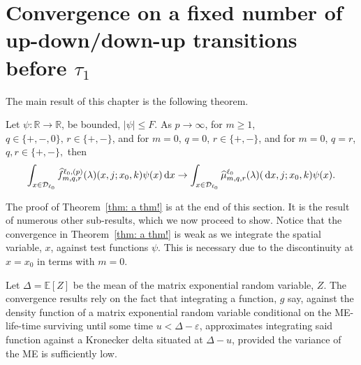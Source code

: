 \section{Convergence on a fixed number of up-down/down-up transitions before \(\tau_1\)}\label{sec: no change convergence}
The main result of this chapter is the following theorem.
\begin{thm}\label{thm: a thm!}
	Let \(\psi:\mathbb R\to\mathbb R\), be bounded, \(|\psi|\leq F\). As \(p\to \infty\), for \(m\geq 1\), \(q\in\{+,-,0\},\, r\in\{+,-\}\), and for \(m=0\), \(q=0\), \(r\in\{+,-\}\), and for \(m=0\), \(q=r\), \(q,r\in\{+,-\},\) then
	\begin{align}\int_{x\in\mathcal{D}_{\ell_0}}\widehat f_{m,q,r}^{\ell_0,(p)}(\lambda)(x,j;x_0,k)\psi(x)\, \mathrm{d} x \to \int_{x\in\mathcal{D}_{\ell_0}}\widehat \mu_{m,q,r}^{\ell_0}(\lambda)(\, \mathrm{d} x,j;x_0,k)\psi(x).\label{eqn: thm 2}\end{align}
\end{thm}
The proof of Theorem~\ref{thm: a thm!} is at the end of this section. It is the result of numerous other sub-results, which we now proceed to show. Notice that the convergence in Theorem~\ref{thm: a thm!} is weak as we integrate the spatial variable, \(x\), against test functions \(\psi\). This is necessary due to the discontinuity at \(x=x_0\) in terms with \(m=0\).

Let \(\Delta = \mathbb E[Z]\) be the mean of the matrix exponential random variable, \(Z\). The convergence results rely on the fact that integrating a function, \(g\) say, against the density function of a matrix exponential random variable conditional on the ME-life-time surviving until some time \(u<\Delta-\varepsilon\), approximates integrating said function against a Kronecker delta situated at \(\Delta-u\), provided the variance of the ME is sufficiently low. 

